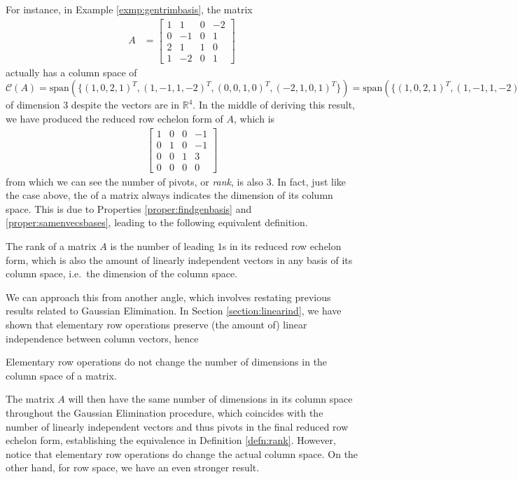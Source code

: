 For instance, in Example \ref{exmp:gentrimbasis}, the matrix
\begin{align*}
A &= 
\begin{bmatrix}
1 & 1 & 0 & -2\\
0 & -1 & 0 & 1\\
2 & 1 & 1 & 0\\
1 & -2 & 0 & 1
\end{bmatrix}
\end{align*}
actually has a column space of $\mathcal{C}(A) = \text{span}(\{(1,0,2,1)^T, (1,-1,1,-2)^T, \allowbreak (0,0,1,0)^T, (-2,1,0,1)^T\}) = \text{span}(\{(1,0,2,1)^T, (1,-1,1,-2)^T, (0,0,1,0)^T\})$ of dimension $3$ despite the vectors are in $\mathbb{R}^4$. In the middle of deriving this result, we have produced the reduced row echelon form of $A$, which is 
\begin{align*}
\begin{bmatrix}
1 & 0 & 0 & -1\\
0 & 1 & 0 & -1\\
0 & 0 & 1 & 3\\
0 & 0 & 0 & 0 
\end{bmatrix}
\end{align*}
from which we can see the number of pivots, or \textit{rank}, is also $3$. In fact, just like the case above, the  of a matrix always indicates the dimension of its column space. This is due to Properties \ref{proper:findgenbasis} and \ref{proper:samenvecsbases}, leading to the following equivalent definition.
\begin{defn}[Rank]
\label{defn:rank}
The rank of a matrix $A$ is the number of leading $1$s in its reduced row echelon form, which is also the amount of linearly independent vectors in any basis of its column space, i.e.\ the dimension of the column space.
\end{defn}
We can approach this from another angle, which involves restating previous results related to Gaussian Elimination. In Section \ref{section:linearind}, we have shown that elementary row operations preserve (the amount of) linear independence between column vectors, hence
\begin{proper}
\label{proper:elemrowopcolrank}
Elementary row operations do not change the number of dimensions in the column space of a matrix.
\end{proper}
The matrix $A$ will then have the same number of dimensions in its column space throughout the Gaussian Elimination procedure, which coincides with the number of linearly independent vectors and thus pivots in the final reduced row echelon form, establishing the equivalence in Definition \ref{defn:rank}. However, notice that elementary row operations do change the actual column space. On the other hand, for row space, we have an even stronger result.
